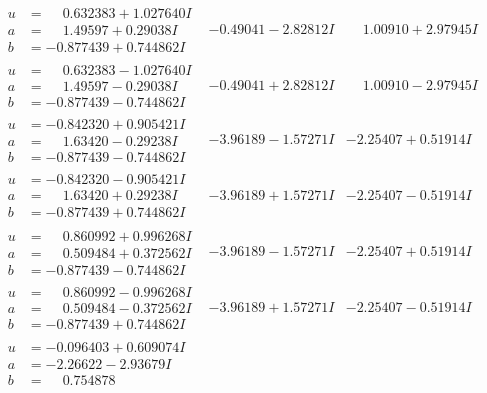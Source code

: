 \documentclass[1p]{elsarticle_modified}
\theoremstyle{definition}
\begin{document}
$$\begin{array}{c|c|c}
\begin{aligned}
u &= \phantom{-}0.632383 + 1.027640 I \\
a &= \phantom{-}1.49597 + 0.29038 I \\
b &= -0.877439 + 0.744862 I\end{aligned}
 & -0.49041 - 2.82812 I & \phantom{-}1.00910 + 2.97945 I \\ \hline\begin{aligned}
u &= \phantom{-}0.632383 - 1.027640 I \\
a &= \phantom{-}1.49597 - 0.29038 I \\
b &= -0.877439 - 0.744862 I\end{aligned}
 & -0.49041 + 2.82812 I & \phantom{-}1.00910 - 2.97945 I \\ \hline\begin{aligned}
u &= -0.842320 + 0.905421 I \\
a &= \phantom{-}1.63420 - 0.29238 I \\
b &= -0.877439 - 0.744862 I\end{aligned}
 & -3.96189 - 1.57271 I & -2.25407 + 0.51914 I \\ \hline\begin{aligned}
u &= -0.842320 - 0.905421 I \\
a &= \phantom{-}1.63420 + 0.29238 I \\
b &= -0.877439 + 0.744862 I\end{aligned}
 & -3.96189 + 1.57271 I & -2.25407 - 0.51914 I \\ \hline\begin{aligned}
u &= \phantom{-}0.860992 + 0.996268 I \\
a &= \phantom{-}0.509484 + 0.372562 I \\
b &= -0.877439 - 0.744862 I\end{aligned}
 & -3.96189 - 1.57271 I & -2.25407 + 0.51914 I \\ \hline\begin{aligned}
u &= \phantom{-}0.860992 - 0.996268 I \\
a &= \phantom{-}0.509484 - 0.372562 I \\
b &= -0.877439 + 0.744862 I\end{aligned}
 & -3.96189 + 1.57271 I & -2.25407 - 0.51914 I \\ \hline\begin{aligned}
u &= -0.096403 + 0.609074 I \\
a &= -2.26622 - 2.93679 I \\
b &= \phantom{-}0.754878\phantom{ +0.000000I}\end{aligned}

\end{array}$$
\end{document}
